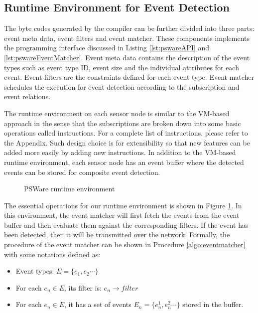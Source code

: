 \subsection{Runtime Environment for Event Detection}
The byte codes generated by the compiler can be further divided into three parts: event meta data, event filters and event matcher. These components implements the programming interface discussed in Listing \ref{lst:pswareAPI} and \ref{lst:pswareEventMatcher}. Event meta data contains the description of the event types such as event type ID, event size and the individual attributes for each event. Event filters are the constraints defined for each event type. Event matcher schedules the execution for event detection according to the subscription and event relations.

The runtime environment on each sensor node is similar to the VM-based approach \cite{mate} in the sense that the subscriptions are broken down into some basic operations called instructions. For a complete list of instructions, please refer to the Appendix. Such design choice is for extensibility so that new features can be added more easily by adding new instructions. In addition to the VM-based runtime environment, each sensor node has an event buffer where the detected events can be stored for composite event detection.

\begin{figure}
\centering
{}
\caption{PSWare runtime environment}
\label{fig:eventdetectionframework2}
\end{figure}
The essential operations for our runtime environment is shown in Figure \ref{fig:eventdetectionframework2}. In this environment, the event matcher will first fetch the events from the event buffer and then evaluate them against the corresponding filters. If the event has been detected, then it will be transmitted over the network. Formally, the procedure of the event matcher can be shown in Procedure \ref{algo:eventmatcher} with some notations defined as:
\begin{itemize}
\item Event types: \(E=\{e_1, e_2 \cdots \}\)
\item For each \(e_n\in E\), its filter is: \(e_n\rightarrow filter\)
\item For each \(e_n\in E\), it has a set of events \(E_n=\{e_n^1, e_n^2 \cdots \}\) stored in the buffer.
\end{itemize}

